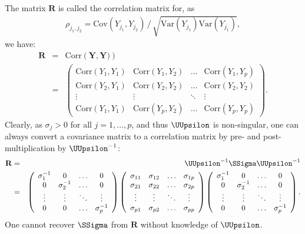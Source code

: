\documentclass[a4paper]{article}
\theoremstyle{myexamplestyle}
\begin{document}
The matrix $\mathbf{R}$ is called the correlation matrix for, as
\begin{eqnarray*}
\rho_{j_1, j_2} = \mbox{Cov}(Y_{j_1}, Y_{j_2}) \, / \, \sqrt{ \mbox{Var}(Y_{j_1}) \mbox{Var}(Y_{j_1}) },
\end{eqnarray*}
we have:
\begin{eqnarray*}
\mathbf{R} & = & \mbox{Corr}(\mathbf{Y}, \mathbf{Y)})
\\
& = &
\left(
\begin{array}{cccc}
\mbox{Corr}(Y_1, Y_1) & \mbox{Corr}(Y_1, Y_2) & \ldots & \mbox{Corr}(Y_1, Y_p)
\\
\mbox{Corr}(Y_2, Y_1) & \mbox{Corr}(Y_2, Y_2) & \ldots & \mbox{Corr}(Y_2, Y_2)
\\
\vdots & \vdots & \ddots & \vdots
\\
\mbox{Corr}(Y_1, Y_1) & \mbox{Corr}(Y_p, Y_2) & \ldots & \mbox{Corr}(Y_p, Y_p)
\end{array}
\right).
\end{eqnarray*}
Clearly, as $\sigma_j > 0$ for all $j=1, \ldots, p$, and thus $\UUpsilon$ is non-singular, one can always convert a covariance matrix to a correlation matrix by pre- and post-multiplication by $\UUpsilon^{-1}$:
\begin{eqnarray*}
\mathbf{R} & = & \UUpsilon^{-1} \SSigma \UUpsilon^{-1}
\\
& = & \left(
\begin{array}{cccc}
\sigma_{1}^{-1} & 0 & \ldots & 0
\\
0 & \sigma_{2}^{-1} & \ldots & 0
\\
\vdots & \vdots & \ddots & \vdots
\\
0 & 0 & \ldots & \sigma_{p}^{-1}
\end{array}
\right)
\left(
\begin{array}{cccc}
\sigma_{11} & \sigma_{12} & \ldots & \sigma_{1p}
\\
\sigma_{21} & \sigma_{22} & \ldots & \sigma_{2p}
\\
\vdots & \vdots & \ddots & \vdots
\\
\sigma_{p1} & \sigma_{p2} & \ldots & \sigma_{pp}
\end{array}
\right)
\left(
\begin{array}{cccc}
\sigma_{1}^{-1} & 0 & \ldots & 0
\\
0 & \sigma_{2}^{-1} & \ldots & 0
\\
\vdots & \vdots & \ddots & \vdots
\\
0 & 0 & \ldots & \sigma_{p}^{-1}
\end{array}
\right).
\end{eqnarray*}
One cannot recover $\SSigma$ from $\mathbf{R}$ without knowledge of $\UUpsilon$.
\end{document}
